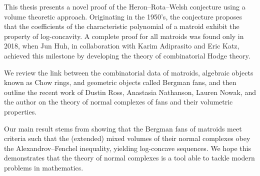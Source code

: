 \documentclass{article}
\begin{document}
This thesis presents a novel proof of the Heron--Rota--Welsh conjecture using a volume theoretic approach.
Originating in the 1950's, the conjecture proposes that the coefficients of the characteristic polynomial of a matroid exhibit the property of log-concavity.
A complete proof for all matroids was found only in 2018, when Jun Huh, in collaboration with Karim Adiprasito and Eric Katz, achieved this milestone by developing the theory of combinatorial Hodge theory.

We review the link between the combinatorial data of matroids, algebraic objects known as Chow rings, and geometric objects called Bergman fans, and then outline the recent work of Dustin Ross, Anastasia Nathanson, Lauren Nowak, and the author on the theory of normal complexes of fans and their volumetric properties.

Our main result stems from showing that the Bergman fans of matroids meet criteria such that the (extended) mixed volumes of their normal complexes obey the Alexandrov--Fenchel inequality, yielding log-concave sequences.
We hope this demonstrates that the theory of normal complexes is a tool able to tackle modern problems in mathematics.
\end{document}

